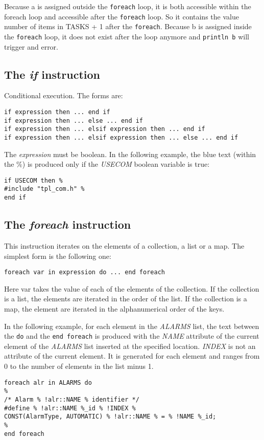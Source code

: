 \documentclass[11pt]{article}
\newcommand{\var}[1]{{\ttfamily\em #1}}
\begin{document}
Because a is assigned outside the {\tt foreach} loop, it is both accessible within the foreach loop and accessible after the {\tt foreach} loop. So it contains the value number of items in TASKS + 1 after the {\tt foreach}. Because b is assigned inside the {\tt foreach} loop, it does not exist after the loop anymore and {\tt println b} will trigger and error.

\subsection{The {\em if} instruction}

Conditional execution. The forms are:

\begin{lstlisting}
if expression then ... end if
if expression then ... else ... end if
if expression then ... elsif expression then ... end if
if expression then ... elsif expression then ... else ... end if
\end{lstlisting}    

The {\em expression} must be boolean. In the following example, the blue text (within the \%) is produced only if the \var{USECOM} boolean variable is true:

\begin{lstlisting}
if USECOM then %
#include "tpl_com.h" %
end if
\end{lstlisting}

\subsection{The {\em foreach} instruction}

This instruction iterates on the elements of a collection, a list or a map. The simplest form is the following one:

\begin{lstlisting}
foreach var in expression do ... end foreach
\end{lstlisting}

Here var takes the value of each of the elements of the collection. If the collection is a list, the elements are iterated in the order of the list. If the collection is a map, the element are iterated in the alphanumerical order of the keys.

In the following example, for each element in the \var{ALARMS} list, the text between the {\tt do} and the {\tt end foreach} is produced with the \var{NAME} attribute of the current element of the \var{ALARMS} list inserted at the specified location. \var{INDEX} is not an attribute of the current element. It is generated for each element and ranges from 0 to the number of elements in the list minus 1.
\begin{lstlisting}
foreach alr in ALARMS do
%
/* Alarm % !alr::NAME % identifier */
#define % !alr::NAME %_id % !INDEX %
CONST(AlarmType, AUTOMATIC) % !alr::NAME % = % !NAME %_id;
%
end foreach
\end{lstlisting}
\end{document}

